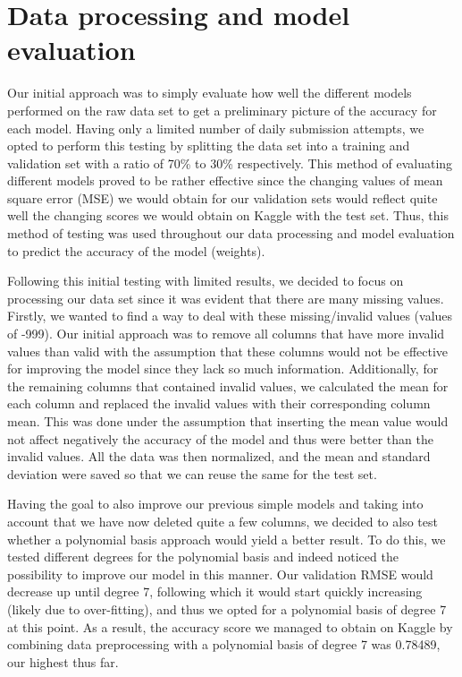 \documentclass[10pt,conference,compsocconf]{IEEEtran}
\begin{document}
\section{Data processing and model evaluation}

Our initial approach was to simply evaluate how well the different models performed on the raw data set to get a preliminary picture of the accuracy for each model. Having only a limited number of daily submission attempts, we opted to perform this testing by splitting the data set into a training and validation set with a ratio of 70\% to 30\% respectively. This method of evaluating different models proved to be rather effective since the changing values of mean square error (MSE) we would obtain for our validation sets would reflect quite well the changing scores we would obtain on Kaggle with the test set. Thus, this method of testing was used throughout our data processing and model evaluation to predict the accuracy of the model (weights).

Following this initial testing with limited results, we decided to focus on processing our data set since it was evident that there are many missing values. Firstly, we wanted to find a way to deal with these missing/invalid values (values of -999). Our initial approach was to remove all columns that have more invalid values than valid with the assumption that these columns would not be effective for improving the model since they lack so much information. Additionally, for the remaining columns that contained invalid values, we calculated the mean for each column and replaced the invalid values with their corresponding column mean. This was done under the assumption that inserting the mean value would not affect negatively the accuracy of the model and thus were better than the invalid values. All the data was then normalized, and the mean and standard deviation were saved so that we can reuse the same for the test set.

Having the goal to also improve our previous simple models and taking into account that we have now deleted quite a few columns, we decided to also test whether a polynomial basis approach would yield a better result. To do this, we tested different degrees for the polynomial basis and indeed noticed the possibility to improve our model in this manner. Our validation RMSE would decrease up until degree 7, following which it would start quickly increasing (likely due to over-fitting), and thus we opted for a polynomial basis of degree 7 at this point. As a result, the accuracy score we managed to obtain on Kaggle by combining data preprocessing with a polynomial basis of degree 7 was 0.78489, our highest thus far.
\end{document}
